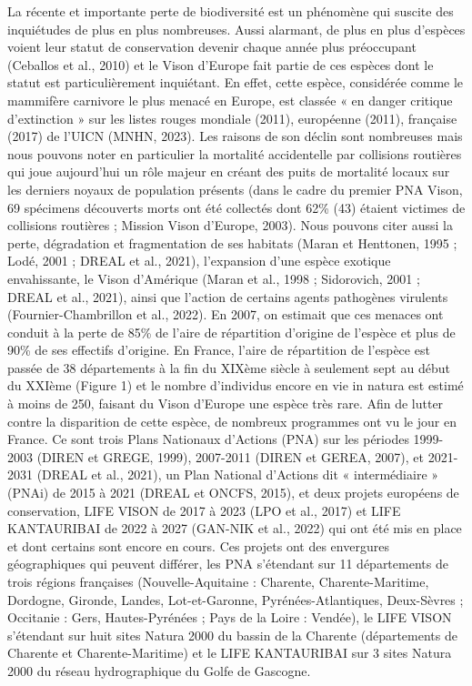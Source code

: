 \documentclass[
  letterpaper,
  DIV=11,
  numbers=noendperiod]{scrreprt}
\begin{document}
La récente et importante perte de biodiversité est un phénomène qui
suscite des inquiétudes de plus en plus nombreuses. Aussi alarmant, de
plus en plus d'espèces voient leur statut de conservation devenir chaque
année plus préoccupant (Ceballos et al., 2010) et le Vison d'Europe fait
partie de ces espèces dont le statut est particulièrement inquiétant. En
effet, cette espèce, considérée comme le mammifère carnivore le plus
menacé en Europe, est classée « en danger critique d'extinction » sur
les listes rouges mondiale (2011), européenne (2011), française (2017)
de l'UICN (MNHN, 2023). Les raisons de son déclin sont nombreuses mais
nous pouvons noter en particulier la mortalité accidentelle par
collisions routières qui joue aujourd'hui un rôle majeur en créant des
puits de mortalité locaux sur les derniers noyaux de population présents
(dans le cadre du premier PNA Vison, 69 spécimens découverts morts ont
été collectés dont 62\% (43) étaient victimes de collisions routières ;
Mission Vison d'Europe, 2003). Nous pouvons citer aussi la perte,
dégradation et fragmentation de ses habitats (Maran et Henttonen, 1995 ;
Lodé, 2001 ; DREAL et al., 2021), l'expansion d'une espèce exotique
envahissante, le Vison d'Amérique (Maran et al., 1998 ; Sidorovich, 2001
; DREAL et al., 2021), ainsi que l'action de certains agents pathogènes
virulents (Fournier-Chambrillon et al., 2022). En 2007, on estimait que
ces menaces ont conduit à la perte de 85\% de l'aire de répartition
d'origine de l'espèce et plus de 90\% de ses effectifs d'origine. En
France, l'aire de répartition de l'espèce est passée de 38 départements
à la fin du XIXème siècle à seulement sept au début du XXIème (Figure 1)
et le nombre d'individus encore en vie in natura est estimé à moins de
250, faisant du Vison d'Europe une espèce très rare. Afin de lutter
contre la disparition de cette espèce, de nombreux programmes ont vu le
jour en France. Ce sont trois Plans Nationaux d'Actions (PNA) sur les
périodes 1999-2003 (DIREN et GREGE, 1999), 2007-2011 (DIREN et GEREA,
2007), et 2021-2031 (DREAL et al., 2021), un Plan National d'Actions dit
« intermédiaire » (PNAi) de 2015 à 2021 (DREAL et ONCFS, 2015), et deux
projets européens de conservation, LIFE VISON de 2017 à 2023 (LPO et
al., 2017) et LIFE KANTAURIBAI de 2022 à 2027 (GAN-NIK et al., 2022) qui
ont été mis en place et dont certains sont encore en cours. Ces projets
ont des envergures géographiques qui peuvent différer, les PNA
s'étendant sur 11 départements de trois régions françaises
(Nouvelle-Aquitaine : Charente, Charente-Maritime, Dordogne, Gironde,
Landes, Lot-et-Garonne, Pyrénées-Atlantiques, Deux-Sèvres ; Occitanie :
Gers, Hautes-Pyrénées ; Pays de la Loire : Vendée), le LIFE VISON
s'étendant sur huit sites Natura 2000 du bassin de la Charente
(départements de Charente et Charente-Maritime) et le LIFE KANTAURIBAI
sur 3 sites Natura 2000 du réseau hydrographique du Golfe de Gascogne.
\end{document}
